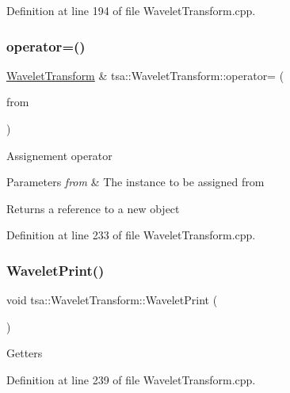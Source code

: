 Definition at line 194 of file Wavelet\+Transform.\+cpp.

\mbox{\label{classtsa_1_1_wavelet_transform_af8ca4e2e5be0413ef4ed484d27e2ff8b}} 
\subsubsection{\texorpdfstring{operator=()}{operator=()}}
{\footnotesize\ttfamily \hyperlink{classtsa_1_1_wavelet_transform}{Wavelet\+Transform} \& tsa\+::\+Wavelet\+Transform\+::operator= (\begin{DoxyParamCaption}\item[{const \hyperlink{classtsa_1_1_wavelet_transform}{Wavelet\+Transform} \&}]{from }\end{DoxyParamCaption})}

Assignement operator


\begin{DoxyParams}{Parameters}
{\em from} & The instance to be assigned from\\
\hline
\end{DoxyParams}
\begin{DoxyReturn}{Returns}
a reference to a new object 
\end{DoxyReturn}


Definition at line 233 of file Wavelet\+Transform.\+cpp.

\mbox{\label{classtsa_1_1_wavelet_transform_ae18b8342c7cfd37728a40691ec12f6f5}} 
\subsubsection{\texorpdfstring{Wavelet\+Print()}{WaveletPrint()}}
{\footnotesize\ttfamily void tsa\+::\+Wavelet\+Transform\+::\+Wavelet\+Print (\begin{DoxyParamCaption}{ }\end{DoxyParamCaption})}

Getters 

Definition at line 239 of file Wavelet\+Transform.\+cpp.

